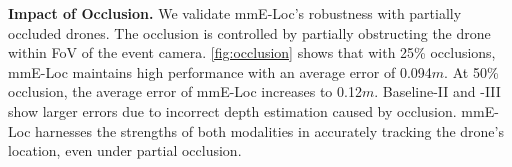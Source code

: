 \textbf{Impact of Occlusion.}
We validate mmE-Loc's robustness with partially occluded drones. 
The occlusion is controlled by partially obstructing the drone within FoV of the event camera.
\fig \ref{fig:occlusion} shows that with 25\% occlusions, mmE-Loc maintains high performance with an average error of 0.094$m$. 
At 50\% occlusion, the average error of mmE-Loc increases to 0.12$m$. 
Baseline-II and -III show larger errors due to incorrect depth estimation caused by occlusion. 
mmE-Loc harnesses the strengths of both modalities in accurately tracking the drone’s location, even under partial occlusion.

